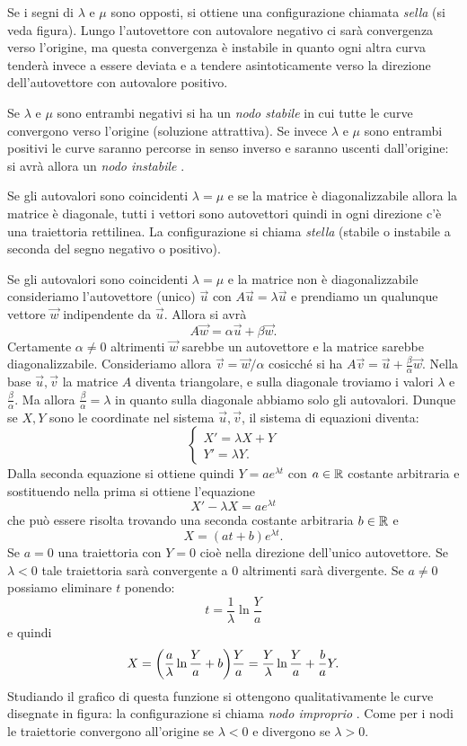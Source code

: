 Se i segni di $\lambda$ e $\mu$ sono opposti,
si ottiene una configurazione chiamata
\emph{sella}%
 (si veda figura).
Lungo l'autovettore con autovalore negativo
ci sarà convergenza verso l'origine, ma questa
convergenza è instabile in quanto ogni altra
curva tenderà invece a essere deviata
e a tendere asintoticamente verso la direzione
dell'autovettore con autovalore positivo.

Se $\lambda$ e $\mu$ sono entrambi negativi si
ha un \emph{nodo stabile}%
 in cui tutte le
curve convergono verso l'origine (soluzione
attrattiva). Se invece $\lambda$ e $\mu$
sono entrambi positivi le curve
saranno percorse in senso inverso e saranno
uscenti dall'origine: si avrà allora
un \emph{nodo instabile}%
.

Se gli autovalori sono coincidenti $\lambda=\mu$
e se la matrice è diagonalizzabile allora
la matrice è diagonale, tutti i vettori sono
autovettori quindi in ogni direzione c'è
una traiettoria rettilinea.
La configurazione si
chiama \emph{stella}%
 (stabile o instabile a seconda
del segno negativo o positivo).

Se gli autovalori sono coincidenti $\lambda = \mu$ e la matrice
non è diagonalizzabile consideriamo l'autovettore (unico)
$\vec u$ con $A \vec u = \lambda \vec u$
e prendiamo un qualunque vettore $\vec w$
indipendente da $\vec u$. Allora si avrà
\[
  A \vec w = \alpha \vec u + \beta \vec w.
\]
Certamente $\alpha \neq 0$ altrimenti $\vec w$
sarebbe un autovettore e la matrice sarebbe diagonalizzabile.
Consideriamo allora $\vec v = \vec w / \alpha$
cosicché si ha $A \vec v = \vec u + \frac{\beta}{\alpha} \vec w$.
Nella base $\vec u, \vec v$ la matrice $A$ diventa
triangolare, e sulla diagonale troviamo i valori $\lambda$
e $\frac{\beta}{\alpha}$.
Ma allora $\frac{\beta}{\alpha} = \lambda$ in quanto sulla diagonale
abbiamo solo gli autovalori. Dunque se $X,Y$ sono le coordinate nel
sistema $\vec u, \vec v$, il sistema di equazioni diventa:
\[
\begin{cases}
X' = \lambda X + Y \\
Y' = \lambda Y.
\end{cases}
\]
Dalla seconda equazione si ottiene quindi $Y = a e^{\lambda t}$
con $a\in {\mathbb R}$ costante arbitraria
e sostituendo nella prima si ottiene l'equazione
\[
  X' - \lambda X = a e^{\lambda t}
\]
che può essere risolta trovando una seconda costante arbitraria $b\in {\mathbb R}$ e
\[
  X = (at+b) e^{\lambda t}.
\]
Se $a=0$ una traiettoria con $Y=0$ cioè nella direzione dell'unico autovettore.
Se $\lambda <0$ tale traiettoria sarà convergente a $0$ altrimenti sarà divergente.
Se $a\neq 0$ possiamo eliminare $t$ ponendo:
\[
  t = \frac 1 \lambda \ln \frac{Y}{a}
\]
e quindi
\[
  X = {\left( \frac{a}{\lambda} \ln \frac{Y}{a}+ b \right)} \frac{Y}{a}
  =  \frac{Y}{\lambda}\ln \frac{Y}{a}+ \frac{b}{a}Y.
\]
Studiando il grafico di questa funzione si ottengono qualitativamente
le curve disegnate in figura: la configurazione si chiama \emph{nodo improprio}%
.
Come per i nodi le traiettorie convergono all'origine se $\lambda < 0$ e
divergono se $\lambda >0$.


